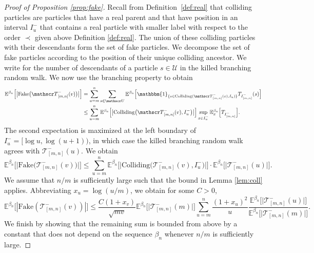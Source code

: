 \documentclass[a4paper, a4wide, 10pt, reqno]{amsart}
\theoremstyle{plain}
\theoremstyle{definition}
\numberwithin{equation}{section}
\newcommand{\E}{\mathbb E}
\newcommand{\sT}{{\mathscr T}}
\newcommand{\sU}{{\mathscr U}}
\newcommand{\ind}[1]{\mathbbm{1}_{\{#1\}}}
\begin{document}
\begin{proof}[Proof of Proposition \ref{prop:fake}] 
Recall from Definition~\ref{def:real} that colliding particles are particles that have a real parent and that have position in an interval $I_u^-$ that contains a real particle with smaller label with respect to the order $\prec$ given above Definition \ref{def:real}. The union of these colliding particles with their descendants form the set of fake particles. We decompose the set of fake particles according to the position of their unique colliding ancestor. We write  for the number of descendants of a particle $s\in \sU$ in the killed branching random walk. We now use  the branching property to obtain 
    \[
    \begin{aligned}
    \E^{\beta_n}\Big[\big|\mathrm{Fake}\big(\sT_{[m,n]}^-(v)\big)\big|\Big] &= \sum_{u=m}^n\sum_{s\in \sU}\E^{\beta_n}\Big[\ind{s\in \mathrm{Colliding}(\sT^-_{[m,n]}(v), I_u)}T_{I^-_{[m,n]}}(s)\Big]\\
    &\le \sum_{u=m}^n\E^{\beta_n}\Big[\big|\mathrm{Colliding}\big(\sT^-_{[m,n]}(v), I^-_u\big)\big|\Big]\sup_{x\in I^-_u}\E_{x}^{\beta_n}\Big[T_{I^-_{[m,n]}}\Big].
    \end{aligned}
    \]
    The second expectation is maximized at the left boundary of $I_u^-=\big[\log u, \log(u+1)\big)$, in which case the killed branching random walk agrees with $\sT^-_{[m,n]}(u)$. We obtain %
    \[
    \E^{\beta_n}\Big[\big|\mathrm{Fake}\big(\sT_{[m,n]}^-(v)\big)\big|\Big] \le 
\sum_{u=m}^n\E^{\beta_n}\Big[\big|\mathrm{Colliding}\big(\sT^-_{[m,n]}(v), I^-_u\big)\big|\Big]\cdot\E^{\beta_n}\Big[\big|
    \sT_{[m,n]}^-(u)\big|\Big].
    \]
    We assume that $n/m$ is sufficiently large such that the bound in Lemma \ref{lem:coll} applies. Abbreviating $x_u=\log(u/m)$, we obtain for some $C>0$,
    \begin{equation}\label{eq:fake-proof}
        \E^{\beta_n}\big[|\mathrm{Fake}(\sT_{[m,n]}^-(v))|\big]
        \le \frac{C(1+x_v)}{\sqrt{mv}}\E^{\beta_n}\big[\big|\sT^-_{[m,n]}(m)\big|\big]\sum_{u=m}^n\frac{(1+x_u)^2}{u} \frac{\E^{\beta_n}\big[\big|\sT^-_{[m,n]}(u)\big|\big]}{\E^{\beta_n}\big[\big|\sT^-_{[m,n]}(m)\big|\big]}.
    \end{equation}
    We finish by showing that the remaining sum is bounded from above by a constant that does not depend on the sequence $\beta_n$ whenever $n/m$ is sufficiently large. \smallskip
    

\end{proof}
\end{document}
